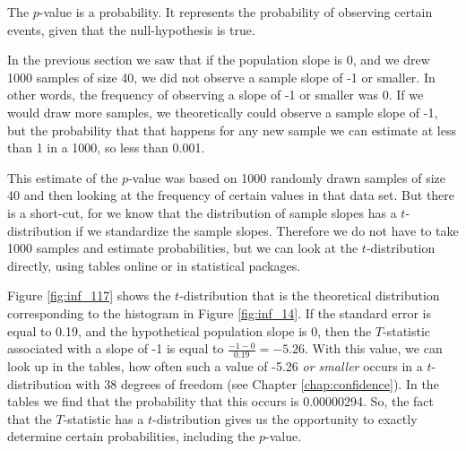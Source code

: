 \documentclass[]{report}\usepackage[]{graphicx}\usepackage[]{color}
\begin{document}
The $p$-value is a probability. It represents the probability of observing certain events, given that the null-hypothesis is true.

In the previous section we saw that if the population slope is 0, and we drew 1000 samples of size 40, we did not observe a sample slope of -1 or smaller. In other words, the frequency of observing a slope of -1 or smaller was 0. If we would draw more samples, we theoretically could observe a sample slope of -1, but the probability that that happens for any new sample we can estimate at less than 1 in a 1000, so less than 0.001.

This estimate of the $p$-value was based on 1000 randomly drawn samples of size 40 and then looking at the frequency of certain values in that data set. But there is a short-cut, for we know that the distribution of sample slopes has a $t$-distribution if we standardize the sample slopes. Therefore we do not have to take 1000 samples and estimate probabilities, but we can look at the $t$-distribution directly, using tables online or in statistical packages.

Figure \ref{fig:inf_117} shows the $t$-distribution that is the theoretical distribution corresponding to the histogram in Figure \ref{fig:inf_14}. If the standard error is equal to 0.19, and the hypothetical population slope is 0, then the $T$-statistic associated with a slope of -1 is equal to $\frac{-1-0}{0.19}=-5.26$. With this value, we can look up in the tables, how often such a value of -5.26 \textit{or smaller} occurs in a $t$-distribution with 38 degrees of freedom (see Chapter \ref{chap:confidence}). In the tables we find that the probability that this occurs is 0.00000294. So, the fact that the $T$-statistic has a $t$-distribution gives us the opportunity to exactly determine certain probabilities, including the $p$-value.
\end{document}
